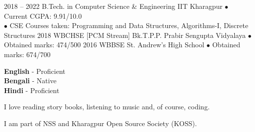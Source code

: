 \documentclass[9pt]{developercv} %
\begin{document}

\begin{entrylist}
	\entry
		{2018 -- 2022}
		{B.Tech. in Computer Science \& Engineering}
		{IIT Kharagpur}
		{$\bullet$ Current CGPA: 9.91/10.0\\
		 $\bullet$ CSE Courses taken: Programming and Data Structures, Algorithms-I, Discrete Structures}
	\entry
		{2018}
		{WBCHSE [PCM Stream]}
		{Bk.T.P.P. Prabir Sengupta Vidyalaya}
		{$\bullet$ Obtained marks: 474/500}
	\entry
		{2016}
		{WBBSE}
		{St. Andrew's High School}
		{$\bullet$ Obtained marks: 674/700}
\end{entrylist}


\begin{minipage}[t]{0.3\textwidth}
	\vspace{-\baselineskip} %

	
	\textbf{English} - Proficient\\
	\textbf{Bengali} - Native\\
	\textbf{Hindi} - Proficient
\end{minipage}
\hfill
\begin{minipage}[t]{0.3\textwidth}
	\vspace{-\baselineskip} %
	
	
	I love reading story books, listening to music and, of course, coding.
\end{minipage}
\hfill
\begin{minipage}[t]{0.3\textwidth}
	\vspace{-\baselineskip} %
	
	
	I am part of NSS and Kharagpur Open Source Society (KOSS).
\end{minipage}

\end{document}
